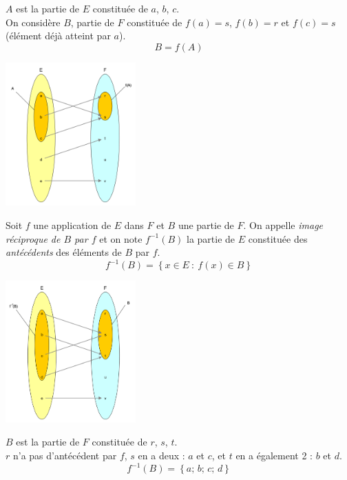 \begin{exemple}[]
    $A$ est la partie de $E$ constituée de $a$, $b$, $c$.\\
    On considère $B$, partie de $F$ constituée de $f(a)=s$, $f(b)=r$ et $f(c)=s$ (élément déjà atteint par $a$).$$B=f(A)$$
    \begin{center}
        \includegraphics[width=5cm]{ensembles/img/im_dir.png}
    \end{center}
\end{exemple}

\begin{definition}
    Soit $f$ une application de $E$ dans $F$ et $B$ une partie de $F$. On appelle \textit{image réciproque de $B$ par $f$} et on note $f^{-1}(B)$ la partie de $E$ constituée des \textit{antécédents} des éléments de $B$ par $f$.
    $$f^{-1}(B)=\left\lbrace x\in E\::\:f(x)\in B\right\rbrace$$
\end{definition}

\begin{exemple}[]
    \begin{center}
        \includegraphics[width=5cm]{ensembles/img/im_rec.png}
    \end{center}
    $B$ est la partie de $F$ constituée de $r$, $s$, $t$.\\
    $r$ n'a pas d'antécédent par $f$, $s$ en a deux : $a$ et $c$, et $t$ en a également 2 : $b$ et $d$.\\
    $$f^{-1}(B)=\left\lbrace a;\,b;\,c;\,d\right\rbrace$$
\end{exemple}

